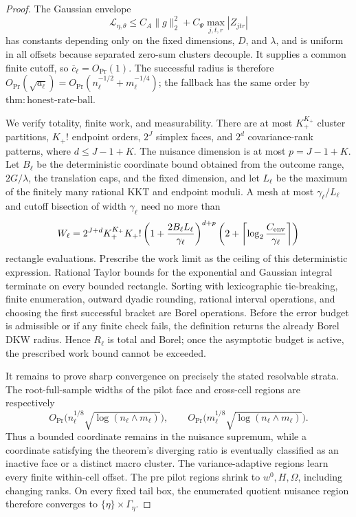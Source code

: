 \documentclass{article}
\begin{document}
\begin{proof}
The Gaussian envelope
\[
 \mathcal L_{\eta,\theta}
 \leq C_A\|g\|_2^2+C_\Psi\max_{j,t,r}|Z_{jtr}|
\]
has constants depending only on the fixed dimensions, \(D\), and \(\lambda\), and is uniform in all offsets because separated zero-sum clusters decouple.  It supplies a common finite cutoff, so \(\overline c_\ell=O_{\Pr}(1)\).  The successful radius is therefore
\(O_{\Pr}(\sqrt{a_\ell})=O_{\Pr}(n_\ell^{-1/2}+m_\ell^{-1/4})\); the fallback has the same order by
\(\mathrm{thm:honest\mbox{-}rate\mbox{-}ball}\).

We verify totality, finite work, and measurability.  There are at most
\(K_+^{K_+}\) cluster partitions, \(K_+!\) endpoint orders, \(2^J\) simplex faces, and \(2^d\) covariance-rank patterns, where
\(d\leq J-1+K\).  The nuisance dimension is at most \(p=J-1+K\).  Let \(B_\ell\) be the deterministic coordinate bound obtained from the outcome range, \(2G/\lambda\), the translation caps, and the fixed dimension, and let \(L_\ell\) be the maximum of the finitely many rational KKT and endpoint moduli.  A mesh at most \(\gamma_\ell/L_\ell\) and cutoff bisection of width \(\gamma_\ell\) need no more than
\[
 W_\ell=
 2^{J+d}K_+^{K_+}K_+!
 \left(1+\frac{2B_\ell L_\ell}{\gamma_\ell}\right)^{d+p}
 \left(2+\left\lceil\log_2\frac{C_{\rm env}}{\gamma_\ell}\right\rceil\right)
\]
rectangle evaluations.  Prescribe the work limit as the ceiling of this deterministic expression.  Rational Taylor bounds for the exponential and Gaussian integral terminate on every bounded rectangle.  Sorting with lexicographic tie-breaking, finite enumeration, outward dyadic rounding, rational interval operations, and choosing the first successful bracket are Borel operations.  Before the error budget is admissible or if any finite check fails, the definition returns the already Borel DKW radius.  Hence \(R_\ell\) is total and Borel; once the asymptotic budget is active, the prescribed work bound cannot be exceeded.

It remains to prove sharp convergence on precisely the stated resolvable strata.  The root-full-sample widths of the pilot face and cross-cell regions are respectively
\[
 O_{\Pr}\bigl(n_\ell^{1/8}\sqrt{\log(n_\ell\wedge m_\ell)}\bigr),
 \qquad
 O_{\Pr}\bigl(m_\ell^{1/8}\sqrt{\log(n_\ell\wedge m_\ell)}\bigr).
\]
Thus a bounded coordinate remains in the nuisance supremum, while a coordinate satisfying the theorem's diverging ratio is eventually classified as an inactive face or a distinct macro cluster.  The variance-adaptive regions learn every finite within-cell offset.  The pre pilot regions shrink to \(w^0,H,\Omega\), including changing ranks.  On every fixed tail box, the enumerated quotient nuisance region therefore converges to \(\{\eta\}\times\Gamma_\eta\).


\end{proof}
\end{document}
